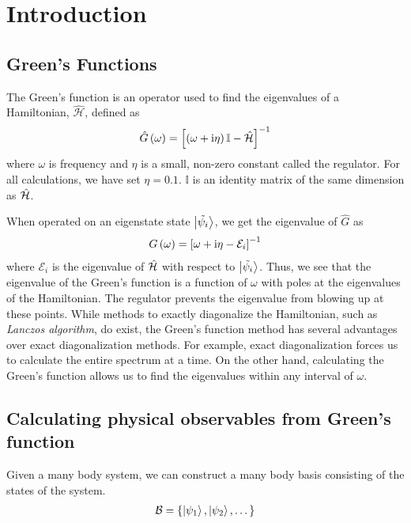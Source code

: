 \chapter{\label{intro}Introduction}

\setcounter{equation}{0}
\setcounter{table}{0}
\setcounter{figure}{0}

\section{Green's Functions}
	The Green's function is an operator used to find the eigenvalues of a  Hamiltonian, $ \hat{\mathcal{H}} $, defined as
	\begin{align}\label{eqn:gf-def}
		\hat{G}\left(\omega\right) = \left[ \left( \omega + \mathrm{i} \eta\right) \mathbb{I} - \hat{\mathcal{H}} \right]^{-1}
	\end{align}
	where $ \omega $ is frequency and $ \eta $ is a small, non-zero constant called the regulator. For all calculations, we have set $ \eta = 0.1 $. $ \mathbb{I} $ is an identity matrix of the same dimension as $ \hat{\mathcal{H}} $.
	
	When operated on an eigenstate state $ \ket{\tilde{\psi_i}} $, we get the eigenvalue of $ \hat{G} $ as
	\begin{align}
		G\left(\omega\right) = \left[ \omega + \mathrm{i} \eta - \mathcal{E}_i \right]^{-1}
	\end{align}
	where $ \mathcal{E}_i $ is the eigenvalue of $ \hat{\mathcal{H}} $ with respect to $ \ket{\tilde{\psi_i}} $. Thus, we see that the eigenvalue of the Green's function is a function of $ \omega $ with poles at the eigenvalues of the Hamiltonian. The regulator prevents the eigenvalue from blowing up at these points. While methods to exactly diagonalize the Hamiltonian, such as \textit{Lanczos algorithm}, do exist, the Green's function method has several advantages over exact diagonalization methods. For example, exact diagonalization forces us to calculate the entire spectrum at a time. On the other hand, calculating the Green's function allows us to find the eigenvalues within any interval of $\omega$.
    
\section{Calculating physical observables from Green's function}
	Given a many body system, we can construct a many body basis consisting of the states of the system.
	\begin{align}
		\mathcal{B} = \{ \ket{\psi_1}, \ket{\psi_2}, \dots \}
	\end{align} 
	
